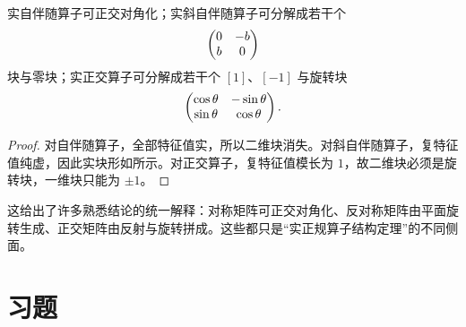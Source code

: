 \begin{corollary}
实自伴随算子可正交对角化；实斜自伴随算子可分解成若干个
\[
\begin{pmatrix} 0&-b\\b&0 \end{pmatrix}
\]
块与零块；实正交算子可分解成若干个 $[1]$、$[-1]$ 与旋转块
\[
\begin{pmatrix} \cos\theta&-\sin\theta\\\sin\theta&\cos\theta \end{pmatrix}.
\]
\end{corollary}

\begin{proof}
对自伴随算子，全部特征值实，所以二维块消失。对斜自伴随算子，复特征值纯虚，因此实块形如所示。对正交算子，复特征值模长为 $1$，故二维块必须是旋转块，一维块只能为 $\pm1$。
\end{proof}

\begin{remark}
这给出了许多熟悉结论的统一解释：对称矩阵可正交对角化、反对称矩阵由平面旋转生成、正交矩阵由反射与旋转拼成。这些都只是“实正规算子结构定理”的不同侧面。
\end{remark}

\section*{习题}

